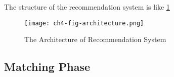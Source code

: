 The structure of the recommendation system is like \figurename{\ref{fig:ch4-fig0}}

\begin{figure}[htbp!]
  \centering
  \texttt{[image: ch4-fig-architecture.png]}
  \caption{The Architecture of Recommendation System}\label{fig:ch4-fig0}
\end{figure}

\subsection{Matching Phase}




